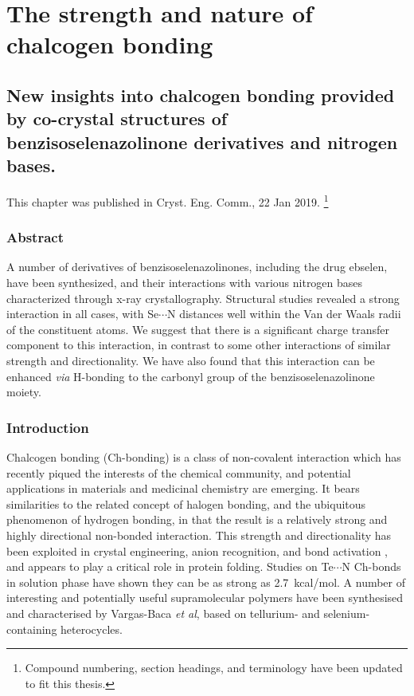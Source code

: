 \part{The strength and nature of chalcogen bonding}
 
\begin{refsection}

\chapter[Insights from co-crystal structures]{New insights into chalcogen bonding provided by co-crystal structures of benzisoselenazolinone derivatives and nitrogen bases.}

This chapter was published in Cryst. Eng. Comm., 22 Jan 2019\autocite{Fellowes2019}. \footnote{Compound numbering, section headings, and terminology have been updated to fit this thesis.}

\section{Abstract}
A number of derivatives of benzisoselenazolinones, including the drug ebselen, have been synthesized, and their interactions with various nitrogen bases characterized through x-ray crystallography.
Structural studies revealed a strong interaction in all cases, with Se$\cdots$N distances well within the Van der Waals radii of the constituent atoms.
We suggest that there is a significant charge transfer component to this interaction, in contrast to some other interactions of similar strength and directionality.
We have also found that this interaction can be enhanced \emph{via} H-bonding to the carbonyl group of the benzisoselenazolinone moiety.


\section{Introduction}
Chalcogen bonding (Ch-bonding) is a class of non-covalent interaction which has recently piqued the interests of the chemical community, and potential applications in materials and medicinal chemistry are emerging.\autocite{Mitchell2017,Wonner2017a,Fanfrlik2014,Vogel2019}
It bears similarities to the related concept of halogen bonding, and the ubiquitous phenomenon of hydrogen bonding, in that the result is a relatively strong and highly directional non-bonded interaction.\autocite{Paolo1974}
This strength and directionality has been exploited in crystal engineering\autocite{Gleiter2003,Kremer2016,Huynh2017}, anion recognition\autocite{Lim2017,Lim2018,Garrett2016}, and bond activation \autocite{Wonner2017,Benz2017,Benz2017a}, and appears to play a critical role in protein folding\autocite{Iwaoka2001,Iwaoka2015}.
Studies on Te$\cdots$N Ch-bonds in solution phase have shown they can be as strong as 2.7~kcal/mol\autocite{Garrett2015a}.
A number of interesting and potentially useful supramolecular polymers have been synthesised and characterised by Vargas-Baca \emph{et al}, based on tellurium- and selenium-containing heterocycles\autocite{Ho2016,Ho2017}.


\end{refsection}
